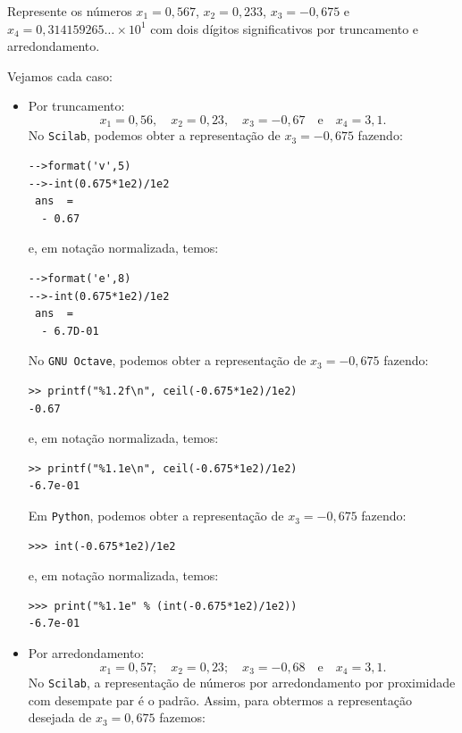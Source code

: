 \begin{ex} Represente os números $x_1 = 0,567$, $x_2 = 0,233$, $x_3 = -0,675$ e $x_4 = 0,314159265 \ldots \times 10^1$ com dois dígitos significativos por truncamento e arredondamento.
\end{ex}
\begin{sol} Vejamos cada caso:
  \begin{itemize}
  \item Por truncamento:
    \begin{equation*}
      x_1=0,56,\quad x_2=0,23,\quad x_3=-0,67\quad\mbox{e}\quad x_4 = 3,1.
    \end{equation*}
\ifisscilab
No \verb+Scilab+, podemos obter a representação de $x_3 = -0,675$ fazendo:
\begin{verbatim}
-->format('v',5)
-->-int(0.675*1e2)/1e2
 ans  =
  - 0.67
\end{verbatim}
e, em notação normalizada, temos:
\begin{verbatim}
-->format('e',8)
-->-int(0.675*1e2)/1e2
 ans  =
  - 6.7D-01
\end{verbatim}
\fi
\ifisoctave
No \verb+GNU Octave+, podemos obter a representação de $x_3 = -0,675$ fazendo:
\begin{verbatim}
>> printf("%1.2f\n", ceil(-0.675*1e2)/1e2)
-0.67
\end{verbatim}
e, em notação normalizada, temos:
\begin{verbatim}
>> printf("%1.1e\n", ceil(-0.675*1e2)/1e2)
-6.7e-01
\end{verbatim}
\fi
\ifispython
Em \verb+Python+, podemos obter a representação de $x_3 = -0,675$ fazendo:
\begin{verbatim}
>>> int(-0.675*1e2)/1e2
\end{verbatim}
e, em notação normalizada, temos:
\begin{verbatim}
>>> print("%1.1e" % (int(-0.675*1e2)/1e2))
-6.7e-01
\end{verbatim}
\fi
\item Por arredondamento:
\begin{equation*}
   x_1=0,57;\quad x_2=0,23;\quad x_3=-0,68\quad\mbox{e}\quad x_4 = 3,1.
\end{equation*}
\ifisscilab
No \verb+Scilab+, a representação de números por arredondamento por proximidade com desempate par é o padrão. Assim, para obtermos a representação desejada de $x_3 = 0,675$ fazemos:

\end{itemize}
\end{sol}
